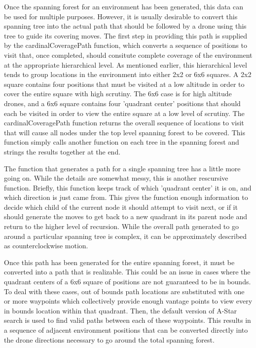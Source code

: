 Once the spanning forest for an environment has been generated, this data can be used for multiple purposes. However, it is usually desirable to convert this spanning tree into the actual path that should be followed by a drone using this tree to guide its covering moves. The first step in providing this path is supplied by the cardinalCoveragePath function, which converts a sequence of positions to visit that, once completed, should consitute complete coverage of the environment at the appropriate hierarchical level. As mentioned earlier, this hierarchical level tends to group locations in the environment into either 2x2 or 6x6 squares. A 2x2 square contains four positions that must be visited at a low altitude in order to cover the entire square with high scrutiny. The 6x6 case is for high altitude drones, and a 6x6 square contains four 'quadrant center' positions that should each be visited in order to view the entire square at a low level of scrutiny. The cardinalCoveragePath function returns the overall sequence of locations to visit that will cause all nodes under the top level spanning forest to be covered. This function simply calls another function on each tree in the spanning forest and strings the results together at the end.

The function that generates a path for a single spanning tree has a little more going on. While the details are somewhat messy, this is another rescursive function. Briefly, this function keeps track of which 'quadrant center' it is on, and which direction is just came from. This gives the function enough information to decide which child of the current node it should attempt to visit next, or if it should generate the moves to get back to a new quadrant in its parent node and return to the higher level of recursion. While the overall path generated to go around a particular spanning tree is complex, it can be approximately described as counterclockwise motion.

Once this path has been generated for the entire spanning forest, it must be converted into a path that is realizable. This could be an issue in cases where the quadrant centers of a 6x6 square of positions are not guaranteed to be in bounds. To deal with these cases, out of bounds path locations are substituted with one or more waypoints which collectively provide enough vantage points to view every in bounds location within that quadrant. Then, the default version of A-Star search is used to find valid paths between each of these waypoints. This results in a sequence of adjacent environment positions that can be converted directly into the drone directions necessary to go around the total spanning forest.

